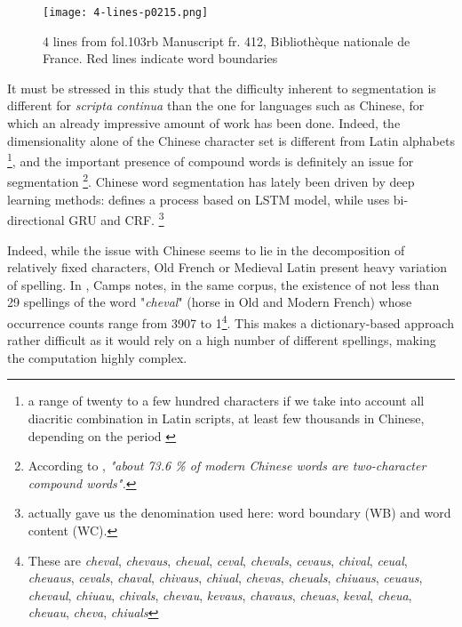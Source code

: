 \documentclass{jdmdh}
\begin{document}
\begin{figure}[!ht]
  \centering
  \texttt{[image: 4-lines-p0215.png]}

  \caption{ 4 lines from fol.103rb Manuscript fr. 412, Bibliothèque nationale de France.  Red lines indicate word boundaries}
  \label{fig:4lines}
\end{figure}

It must be stressed in this study that the difficulty inherent to segmentation is different for \textit{scripta continua} than the one for languages such as Chinese, for which an already impressive amount of work has been done. Indeed, the dimensionality alone of the Chinese character set is different from Latin alphabets \footnote{a range of twenty to a few hundred characters if we take into account all diacritic combination in Latin scripts, at least few thousands in Chinese, depending on the period \cite{routledge}}, and the important presence of compound words  is definitely an issue for segmentation \footnote{According to \cite{tse2017chinese}, \textit{"about 73.6 \% of modern Chinese words are two-character compound words".}}. Chinese word segmentation has lately been driven by deep learning methods: \citet{chen2015long} defines a process based on LSTM model, while \citet{yu2019learning} uses bi-directional GRU and CRF. \footnote{\citet{huang2019realistic} actually gave us the denomination used here: word boundary (WB) and word content (WC).}

Indeed, while the issue with Chinese seems to lie in the decomposition of relatively fixed characters, Old French or Medieval Latin present heavy variation of spelling. In \citet{camps_pandora}, Camps notes, in the same corpus, the existence of not less than 29 spellings of the word "\textit{cheval}" (horse in Old and Modern French) whose occurrence counts range from 3907 to 1\footnote{These are \textit{cheval}, \textit{chevaus}, \textit{cheual}, \textit{ceval}, \textit{chevals}, \textit{cevaus}, \textit{chival}, \textit{ceual}, \textit{cheuaus}, \textit{cevals}, \textit{chaval}, \textit{chivaus}, \textit{chiual}, \textit{chevas}, \textit{cheuals}, \textit{chiuaus}, \textit{ceuaus}, \textit{chevaul}, \textit{chiuau}, \textit{chivals}, \textit{chevau}, \textit{kevaus}, \textit{chavaus}, \textit{cheuas}, \textit{keval}, \textit{cheua}, \textit{cheuau}, \textit{cheva}, \textit{chiuals}}. This  makes a dictionary-based approach rather difficult as it would rely on a high number of different spellings, making the computation highly complex.
\end{document}
